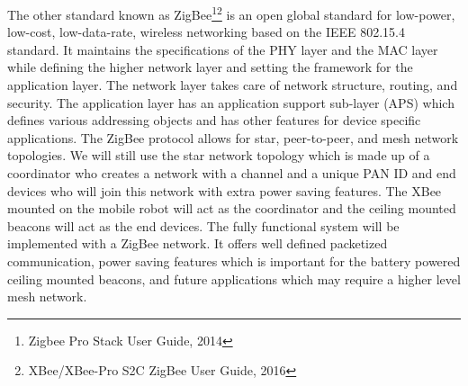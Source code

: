 \documentclass[letterpaper,12pt]{article}   %
\begin{document}
The other standard known as ZigBee\footnote{Zigbee Pro Stack User Guide, 2014}\footnote{XBee/XBee-Pro S2C ZigBee User Guide, 2016} is an open global standard for low-power, low-cost, low-data-rate, wireless networking based on the IEEE 802.15.4 standard. It maintains the specifications of the PHY layer and the MAC layer while defining the higher network layer and setting the framework for the application layer. The network layer takes care of network structure, routing, and security. The application layer has an application support sub-layer (APS) which defines various addressing objects and has other features for device specific applications. The ZigBee protocol allows for star, peer-to-peer, and mesh network topologies. We will still use the star network topology which is made up of a coordinator who creates a network with a channel and a unique PAN ID and end devices who will join this network with extra power saving features. The XBee mounted on the mobile robot will act as the coordinator and the ceiling mounted beacons will act as the end devices. The fully functional system will be implemented with a ZigBee network. It offers well defined packetized communication, power saving features which is important for the battery powered ceiling mounted beacons, and future applications which may require a higher level mesh network.\\
\end{document}
